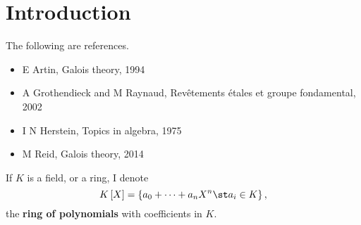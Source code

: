 \documentclass{article}
\begin{document}


\section{Introduction}


The following are references.
\begin{itemize}
\item E Artin, Galois theory, 1994
\item A Grothendieck and M Raynaud, Rev\^etements \'etales et groupe fondamental, 2002
\item I N Herstein, Topics in algebra, 1975
\item M Reid, Galois theory, 2014
\end{itemize}

\begin{notation*}
If $ K $ is a field, or a ring, I denote
$$ K\sbr{X} = \cbr{a_0 + \dots + a_nX^n \st a_i \in K}, $$
the \textbf{ring of polynomials} with coefficients in $ K $.
\end{notation*}
\end{document}
